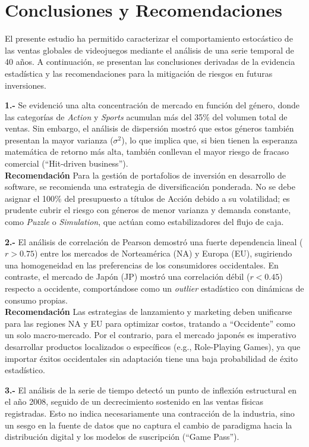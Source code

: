 \documentclass[oneside,11pt]{Latex/Classes/PhDthesisPSnPDF}
\begin{document}
\chapter{Conclusiones y Recomendaciones}

El presente estudio ha permitido caracterizar el comportamiento
estocástico de las ventas globales de videojuegos mediante el análisis
de una serie temporal de 40 años. A continuación, se presentan las
conclusiones derivadas de la evidencia estadística y las recomendaciones
para la mitigación de riesgos en futuras inversiones.

\textbf{1.-} Se evidenció una alta concentración de mercado en función
del género, donde las categorías de \textit{Action} y \textit{Sports}
acumulan más del 35\% del volumen total de ventas. Sin embargo, el
análisis de dispersión mostró que estos géneros también presentan la
mayor varianza (\(\sigma^2\)), lo que implica que, si bien tienen la
esperanza matemática de retorno más alta, también conllevan el mayor
riesgo de fracaso comercial (``Hit-driven business'').\\

\textbf{Recomendación} Para la gestión de portafolios de inversión en
desarrollo de software, se recomienda una estrategia de diversificación
ponderada. No se debe asignar el 100\% del presupuesto a títulos de
Acción debido a su volatilidad; es prudente cubrir el riesgo con géneros
de menor varianza y demanda constante, como \textit{Puzzle} o
\textit{Simulation}, que actúan como estabilizadores del flujo de caja.

\textbf{2.-} El análisis de correlación de Pearson demostró una fuerte
dependencia lineal (\(r > 0.75\)) entre los mercados de Norteamérica
(NA) y Europa (EU), sugiriendo una homogeneidad en las preferencias de
los consumidores occidentales. En contraste, el mercado de Japón (JP)
mostró una correlación débil (\(r < 0.45\)) respecto a occidente,
comportándose como un \textit{outlier} estadístico con dinámicas de
consumo propias.\\

\textbf{Recomendación} Las estrategias de lanzamiento y marketing deben
unificarse para las regiones NA y EU para optimizar costos, tratando a
``Occidente'' como un solo macro-mercado. Por el contrario, para el
mercado japonés es imperativo desarrollar productos localizados o
específicos (e.g., Role-Playing Games), ya que importar éxitos
occidentales sin adaptación tiene una baja probabilidad de éxito
estadístico.

\textbf{3.-} El análisis de la serie de tiempo detectó un punto de
inflexión estructural en el año 2008, seguido de un decrecimiento
sostenido en las ventas físicas registradas. Esto no indica
necesariamente una contracción de la industria, sino un sesgo en la
fuente de datos que no captura el cambio de paradigma hacia la
distribución digital y los modelos de suscripción (``Game Pass'').\\
\end{document}

